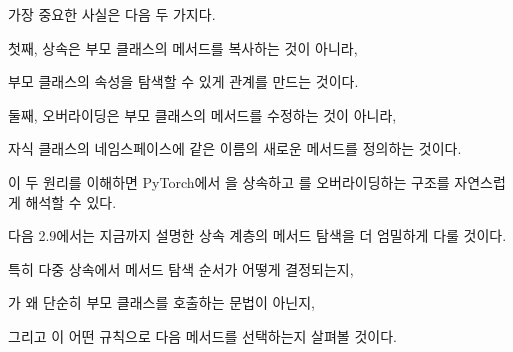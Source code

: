 가장 중요한 사실은 다음 두 가지다.

\begin{dhksmry}
첫째, 상속은 부모 클래스의 메서드를 복사하는 것이 아니라,

부모 클래스의 속성을 탐색할 수 있게 관계를 만드는 것이다.

둘째, 오버라이딩은 부모 클래스의 메서드를 수정하는 것이 아니라,

자식 클래스의 네임스페이스에 같은 이름의 새로운 메서드를 정의하는 것이다.
\end{dhksmry}

이 두 원리를 이해하면 PyTorch에서 을 상속하고 를 오버라이딩하는 구조를 자연스럽게 해석할 수 있다.

다음 2.9에서는 지금까지 설명한 상속 계층의 메서드 탐색을 더 엄밀하게 다룰 것이다.

특히 다중 상속에서 메서드 탐색 순서가 어떻게 결정되는지,

가 왜 단순히 부모 클래스를 호출하는 문법이 아닌지,

그리고 이 어떤 규칙으로 다음 메서드를 선택하는지 살펴볼 것이다.